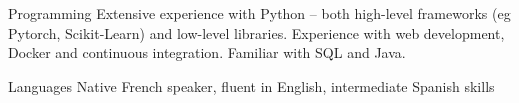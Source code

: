 

\begin{cvskills}

  \cvskill
    {Programming}
    {Extensive experience with Python – both high-level frameworks (eg Pytorch, Scikit-Learn) and low-level libraries.}
  \cvskill
    {}
    {Experience with web development, Docker and continuous integration. Familiar with SQL and Java.}
    
    

  \cvskill
    {Languages} %
    {Native French speaker, fluent in English, intermediate Spanish skills} %

\end{cvskills}
